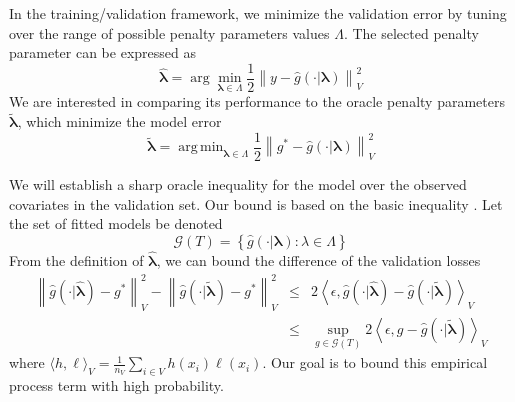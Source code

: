 \documentclass[12pt]{article}
\DeclareMathOperator*{\argmin}{arg\,min}
\begin{document}
In the training/validation framework, we minimize the validation error by tuning over the range of possible penalty parameters values $\Lambda$. The selected penalty parameter can be expressed as
\begin{equation}
\label{cv_lambda}
\hat{\boldsymbol \lambda} = \arg\min_{\boldsymbol{\lambda} \in\Lambda} \frac{1}{2} \left \| y-\hat{g}(\cdot | \boldsymbol \lambda) \right \|_{V}^{2}
\end{equation}
We are interested in comparing its performance to the oracle penalty parameters $\tilde{\boldsymbol \lambda}$, which minimize the model error
\begin{equation}
\tilde{\boldsymbol \lambda} = \argmin_{\boldsymbol{\lambda} \in \Lambda} \frac{1}{2} \left \| g^* - \hat{g}(\cdot | \boldsymbol \lambda) \right \|^2_V
\end{equation}

We will establish a sharp oracle inequality for the model over the observed covariates in the validation set. Our bound is based on the basic inequality \citep{van2000empirical}.  Let the set of fitted models be denoted
\begin{equation}
\label{function_class_GT}
\mathcal{G}(T) = \left \{ \hat{g}(\cdot | \boldsymbol \lambda) : \lambda \in \Lambda  \right \}
\end{equation}
From the definition of $\hat{\boldsymbol \lambda}$, we can bound the difference of the validation losses
\begin{eqnarray}
\label{basic_ineq}
\left \|\hat{g}(\cdot | \hat{\boldsymbol \lambda}) - g^* \right \|_V^2 - \left \| \hat{g}(\cdot | \tilde{\boldsymbol \lambda}) - g^* \right \|_V^2
& \le &
2 \left \langle \epsilon, \hat{g}(\cdot | \hat{\boldsymbol \lambda}) - \hat{g}(\cdot | \tilde{\boldsymbol \lambda}) \right \rangle_V \\
& \le &
\sup_{g \in \mathcal{G}(T)} 2 \left \langle \epsilon, g - \hat{g}(\cdot | \tilde{\boldsymbol \lambda}) \right \rangle_V
\label{eq:basic_ineq_emp_process}
\end{eqnarray}
where $\langle h, \ell \rangle_V = \frac{1}{n_V}\sum_{i\in V} h(x_i) \ell(x_i)$. Our goal is to bound this empirical process term with high probability.
\end{document}

